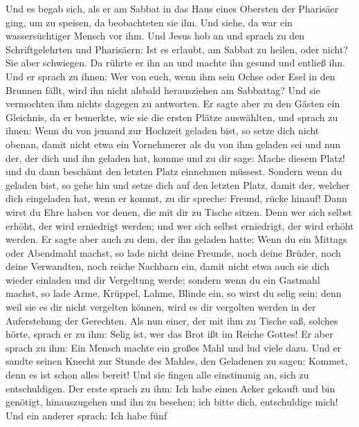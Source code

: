 Und es begab sich, als er am Sabbat in das Haus eines
Obersten der Pharisäer ging, um zu speisen, da beobachteten sie ihn.
 Und siehe, da war ein wassersüchtiger Mensch vor ihm.
 Und Jesus hob an und sprach zu den Schriftgelehrten und
Pharisäern: Ist es erlaubt, am Sabbat zu heilen, oder nicht?
 Sie aber schwiegen. Da rührte er ihn an und machte ihn
gesund und entließ ihn.  Und er sprach zu ihnen: Wer von
euch, wenn ihm sein Ochse oder Esel in den Brunnen fällt, wird ihn nicht
alsbald herausziehen am Sabbattag?  Und sie vermochten ihm
nichts dagegen zu antworten.  Er sagte aber zu den Gästen
ein Gleichnis, da er bemerkte, wie sie die ersten Plätze auswählten, und
sprach zu ihnen:  Wenn du von jemand zur Hochzeit geladen
bist, so setze dich nicht obenan, damit nicht etwa ein Vornehmerer als
du von ihm geladen sei  und nun der, der dich und ihn
geladen hat, komme und zu dir sage: Mache diesem Platz! und du dann
beschämt den letzten Platz einnehmen müssest.  Sondern
wenn du geladen bist, so gehe hin und setze dich auf den letzten Platz,
damit der, welcher dich eingeladen hat, wenn er kommt, zu dir spreche:
Freund, rücke hinauf! Dann wirst du Ehre haben vor denen, die mit dir zu
Tische sitzen.  Denn wer sich selbst erhöht, der wird
erniedrigt werden; und wer sich selbst erniedrigt, der wird erhöht
werden.  Er sagte aber auch zu dem, der ihn geladen
hatte: Wenn du ein Mittags oder Abendmahl machst, so lade nicht deine
Freunde, noch deine Brüder, noch deine Verwandten, noch reiche Nachbarn
ein, damit nicht etwa auch sie dich wieder einladen und dir Vergeltung
werde;  sondern wenn du ein Gastmahl machst, so lade
Arme, Krüppel, Lahme, Blinde ein,  so wirst du selig
sein; denn weil sie es dir nicht vergelten können, wird es dir vergolten
werden in der Auferstehung der Gerechten.  Als nun einer,
der mit ihm zu Tische saß, solches hörte, sprach er zu ihm: Selig ist,
wer das Brot ißt im Reiche Gottes!  Er aber sprach zu
ihm: Ein Mensch machte ein großes Mahl und lud viele dazu.
 Und er sandte seinen Knecht zur Stunde des Mahles, den
Geladenen zu sagen: Kommet, denn es ist schon alles bereit!
 Und sie fingen alle einstimmig an, sich zu
entschuldigen. Der erste sprach zu ihm: Ich habe einen Acker gekauft und
bin genötigt, hinauszugehen und ihn zu besehen; ich bitte dich,
entschuldige mich!  Und ein anderer sprach: Ich habe fünf
